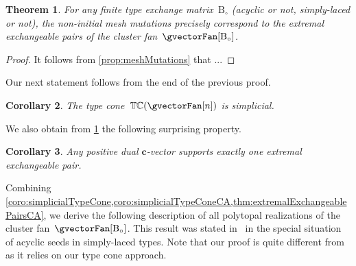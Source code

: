\documentclass{amsart}
\newtheorem{theorem}{Theorem}[section]
\newtheorem{corollary}[theorem]{Corollary}
\theoremstyle{definition}
\renewcommand{\b}[1]{{\boldsymbol{#1}}} %
\newcommand{\vincent}[1]{\todo[color=blue!30]{#1 \\ \hfill --- V.}}
\newcommand{\typeCone}{\mathbb{TC}} %
\newcommand{\B}{\mathrm{B}} %
\begin{document}
\begin{theorem}
\label{thm:extremalExchangeablePairsCA}
For any finite type exchange matrix~$\B_\circ$ (acyclic or not, simply-laced or not), the non-initial mesh mutations precisely correspond to the extremal exchangeable pairs of the cluster fan~$\gvectorFan[\B_\circ]$.
\end{theorem}

\begin{proof}
It follows from \cref{prop:meshMutations} that ...
%
%
\end{proof}

%

Our next statement follows from the end of the previous proof.

\begin{corollary}
\label{coro:simplicialTypeConeCA}
The type cone~$\typeCone(\gvectorFan[n])$ is simplicial.
\end{corollary}

We also obtain from \cref{thm:extremalExchangeablePairsCA} the following surprising property.

\begin{corollary}
Any positive dual $\b{c}$-vector supports exactly one extremal exchangeable pair.
\end{corollary}

Combining \cref{coro:simplicialTypeCone,coro:simplicialTypeConeCA,thm:extremalExchangeablePairsCA}, we derive the following description of all polytopal realizations of the cluster fan~$\gvectorFan[\B_\circ]$.
This result was stated in~\cite{BazierMatteDouvilleMousavandThomasYildirim} in the special situation of acyclic seeds in simply-laced types.
Note that our proof is quite different from~\cite{BazierMatteDouvilleMousavandThomasYildirim} as it relies on our type cone approach.
\end{document}
